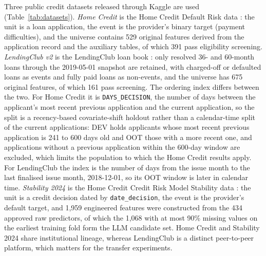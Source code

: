 \documentclass[final,5p,twocolumn]{elsarticle}
\begin{document}
Three public credit datasets released through Kaggle are used (Table~\ref{tab:datasets}). \emph{Home Credit} is the Home Credit Default Risk data \cite{homecredit2018}: the unit is a loan application, the event is the provider's binary target (payment difficulties), and the universe contains 529 original features derived from the application record and the auxiliary tables, of which 391 pass eligibility screening. \emph{LendingClub v2} is the LendingClub loan book \cite{lendingclub_kaggle}: only resolved 36- and 60-month loans through the 2019-05-01 snapshot are retained, with charged-off or defaulted loans as events and fully paid loans as non-events, and the universe has 675 original features, of which 161 pass screening. The ordering index differs between the two. For Home Credit it is \texttt{DAYS\_DECISION}, the number of days between the applicant's most recent previous application and the current application, so the split is a recency-based covariate-shift holdout rather than a calendar-time split of the current applications: DEV holds applicants whose most recent previous application is 241 to 600 days old and OOT those with a more recent one, and applications without a previous application within the 600-day window are excluded, which limits the population to which the Home Credit results apply. For LendingClub the index is the number of days from the issue month to the last finalised issue month, 2018-12-01, so its OOT window is later in calendar time. \emph{Stability 2024} is the Home Credit Credit Risk Model Stability data \cite{homecredit2024}: the unit is a credit decision dated by \texttt{date\_decision}, the event is the provider's default target, and 1,959 engineered features were constructed from the 434 approved raw predictors, of which the 1,068 with at most 90\% missing values on the earliest training fold form the LLM candidate set. Home Credit and Stability 2024 share institutional lineage, whereas LendingClub is a distinct peer-to-peer platform, which matters for the transfer experiments.
\end{document}
